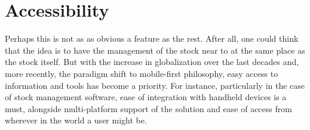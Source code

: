 \section{Accessibility}
Perhaps this is not as as obvious a feature as the rest. After all, one could think that the idea is to have the management of the stock near to at the same place as the stock itself. But with the increase in globalization over the last decades and, more recently, the paradigm shift to mobile-first philosophy, easy access to information and tools has become a priority. For instance, particularly in the case of stock management software, ease of integration with handheld devices is a must, alongside multi-platform support of the solution and ease of access from wherever in the world a user might be.